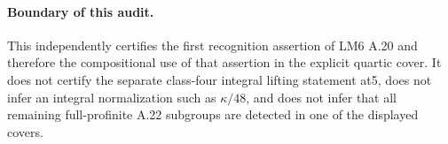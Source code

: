 \paragraph{Boundary of this audit.}
This independently certifies the first recognition assertion of LM6 A.20 and therefore the compositional use of that assertion in the explicit quartic cover. It does not certify the separate class-four integral lifting statement at5, does not infer an integral normalization such as $\kappa/48$, and does not infer that all remaining full-profinite A.22 subgroups are detected in one of the displayed covers.
